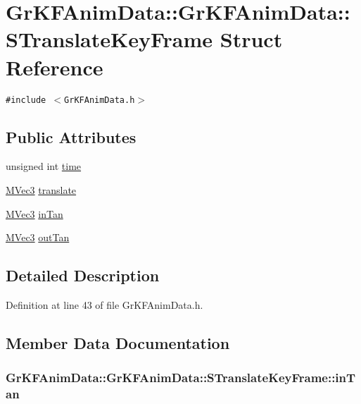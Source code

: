 \hypertarget{struct_gr_k_f_anim_data_1_1_s_translate_key_frame}{
\section{GrKFAnimData::GrKFAnimData::STranslateKeyFrame Struct Reference}
\label{struct_gr_k_f_anim_data_1_1_s_translate_key_frame}
}
{\tt \#include $<$GrKFAnimData.h$>$}

\subsection*{Public Attributes}
\begin{CompactItemize}
\item 
unsigned int \hyperlink{struct_gr_k_f_anim_data_1_1_s_translate_key_frame_ea2e2e411a63b408e5ce12a5895022f9}{time}
\item 
\hyperlink{class_m_vec3}{MVec3} \hyperlink{struct_gr_k_f_anim_data_1_1_s_translate_key_frame_d887aed5252ff42d0a876bb9a1edc95a}{translate}
\item 
\hyperlink{class_m_vec3}{MVec3} \hyperlink{struct_gr_k_f_anim_data_1_1_s_translate_key_frame_72b320e07c99610f600ba2ea6de59320}{inTan}
\item 
\hyperlink{class_m_vec3}{MVec3} \hyperlink{struct_gr_k_f_anim_data_1_1_s_translate_key_frame_775346957ab8985be5ee291fb4871943}{outTan}
\end{CompactItemize}


\subsection{Detailed Description}


Definition at line 43 of file GrKFAnimData.h.

\subsection{Member Data Documentation}
\hypertarget{struct_gr_k_f_anim_data_1_1_s_translate_key_frame_72b320e07c99610f600ba2ea6de59320}{
\subsubsection[{inTan}]{ GrKFAnimData::GrKFAnimData::STranslateKeyFrame::inTan}}
\label{struct_gr_k_f_anim_data_1_1_s_translate_key_frame_72b320e07c99610f600ba2ea6de59320}




